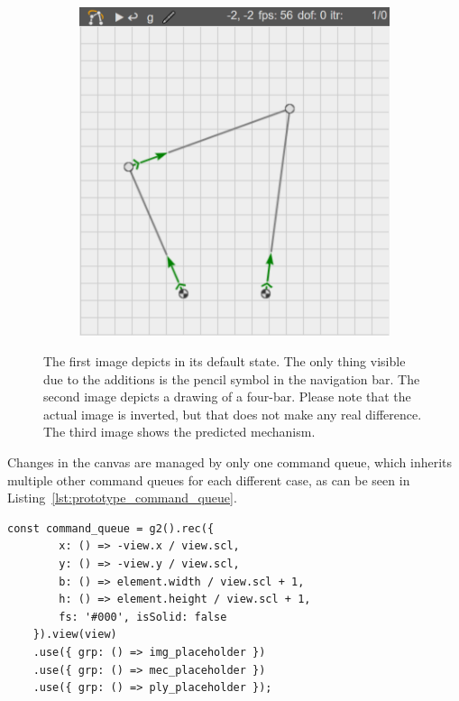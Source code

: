 \begin{figure}
\begin{subfigure}[b]{0.32\textwidth}
        \caption{}\label{fig:prototype_drawing}
    \end{subfigure}
    \begin{subfigure}[b]{0.32\textwidth}
        \includegraphics[width=\textwidth]{images/prototype_after.png}
        \caption{}\label{fig:prototype_after}
    \end{subfigure}
    \caption[deepmech prototype.]{The first image depicts  in its default state. The only thing visible due to the additions is the pencil symbol in the navigation bar.
    The second image depicts a drawing of a four-bar. Please note that the actual image is inverted, but that does not make any real difference.
    The third image shows the predicted mechanism.}\label{fig:prototype}
\end{figure}

Changes in the canvas are managed by only one  command queue, which inherits multiple other command queues for each different case, as can be seen in Listing~\ref{lst:prototype_command_queue}.

\begin{lstlisting}[caption={Command queue for the drawing context in the prototype.}, label={lst:prototype_command_queue}]
const command_queue = g2().rec({
        x: () => -view.x / view.scl,
        y: () => -view.y / view.scl,
        b: () => element.width / view.scl + 1,
        h: () => element.height / view.scl + 1,
        fs: '#000', isSolid: false
    }).view(view)
    .use({ grp: () => img_placeholder })
    .use({ grp: () => mec_placeholder })
    .use({ grp: () => ply_placeholder });
\end{lstlisting}

